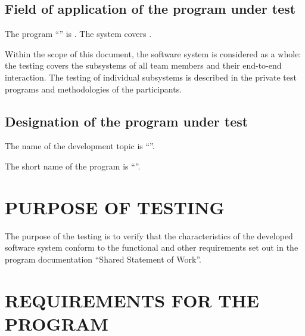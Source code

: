 \documentclass[12pt,a4paper]{extarticle}
\begin{document}
\subsection{Field of application of the program under test}


The program \enquote{\projectname} is . The system covers .

Within the scope of this document, the software system is considered as a whole: the testing covers the subsystems of all team members and their end-to-end interaction. The testing of individual subsystems is described in the private test programs and methodologies of the participants.

\subsection{Designation of the program under test}

The name of the development topic is \enquote{\projectname}.

The short name of the program is \enquote{\hseProjectNameShort}.

\clearpage

\section{PURPOSE OF TESTING}

The purpose of the testing is to verify that the characteristics of the developed software system conform to the functional and other requirements set out in the program documentation \enquote{Shared Statement of Work}.

\clearpage

\section{REQUIREMENTS FOR THE PROGRAM}
\end{document}
